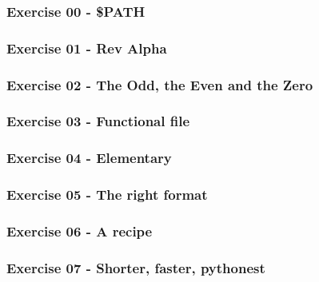 \documentclass[]{article}
\begin{document}
\hypertarget{exercise-00---path}{%
\subsubsection{Exercise 00 - \$PATH}\label{exercise-00---path}}

\hypertarget{exercise-01---rev-alpha}{%
\subsubsection{Exercise 01 - Rev Alpha}\label{exercise-01---rev-alpha}}

\hypertarget{exercise-02---the-odd-the-even-and-the-zero}{%
\subsubsection{Exercise 02 - The Odd, the Even and the
Zero}\label{exercise-02---the-odd-the-even-and-the-zero}}

\hypertarget{exercise-03---functional-file}{%
\subsubsection{Exercise 03 - Functional
file}\label{exercise-03---functional-file}}

\hypertarget{exercise-04---elementary}{%
\subsubsection{Exercise 04 -
Elementary}\label{exercise-04---elementary}}

\hypertarget{exercise-05---the-right-format}{%
\subsubsection{Exercise 05 - The right
format}\label{exercise-05---the-right-format}}

\hypertarget{exercise-06---a-recipe}{%
\subsubsection{Exercise 06 - A recipe}\label{exercise-06---a-recipe}}

\hypertarget{exercise-07---shorter-faster-pythonest}{%
\subsubsection{Exercise 07 - Shorter, faster,
pythonest}\label{exercise-07---shorter-faster-pythonest}}
\end{document}
